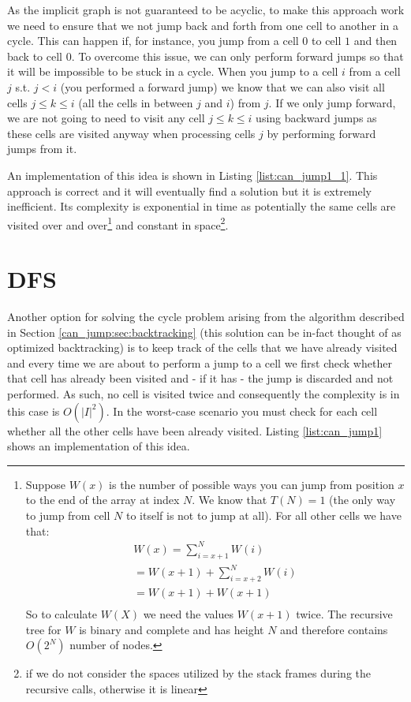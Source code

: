 As the implicit graph is not guaranteed to be acyclic, to make this
approach work we need to ensure that we not jump back and forth from one cell to another in a
cycle. 
This can happen if, for instance,  you jump from a cell $0$ to cell $1$ and then back to cell
$0$. To overcome this issue, we can only perform forward jumps so that it will be impossible
to be stuck in a cycle.
When you jump to a cell $i$ from a cell $j$ s.t. $j < i$ (you performed a forward jump) we know that we can also visit all cells $ j \leq
k \leq i$ (all the cells in between $j$ and $i$) from $j$.
If we only jump forward, we are not going to need to visit any cell $ j \leq k \leq i$ using backward jumps as these cells are visited anyway when processing
cells $j$ by performing forward jumps from it.

An implementation of this idea is shown in Listing
\ref{list:can_jump1_1}. 
This approach is correct and it will eventually find a solution but it is
extremely inefficient. Its complexity is exponential in time as potentially the same cells are
visited over and over\footnote{Suppose $W(x)$ is the number of possible ways you can jump from
position $x$ to the end of the array at index $N$. We know that $T(N) = 1$ (the only way to jump
from cell $N$ to itself is not to jump at all). For all other cells we have that:
    \begin{align*}
        W(x) = \sum_{i=x+1}^N W(i) \\
         = W(x+1) + \sum_{i=x+2}^N W(i) \\
         = W(x+1) + W(x+1) \\
      \end{align*}
    So to calculate $W(X)$ we need the values  $W(x+1)$ twice. The recursive tree for
    $W$ is binary and complete and has height $N$ and therefore contains $O(2^N)$ number of nodes.}
    and constant in space\footnote{if we do not consider the spaces utilized by the stack frames
    during the recursive calls, otherwise it is linear}.

    
 
\section{DFS}
\label{can_jump:sec:DFS}
Another option for solving the cycle problem arising from the algorithm described in Section
\ref{can_jump:sec:backtracking} (this solution can be in-fact thought of as optimized backtracking)
is to keep track of the cells that we have already visited and every time we are about to perform a
jump to a cell we first check whether that cell has already been visited and  - if it has - 
the jump is discarded and not performed. As such, no cell is visited twice and consequently the complexity is in this case is $O(|I|^2)$. In the worst-case scenario you must check for each
cell whether all the other cells have been already visited. Listing \ref{list:can_jump1} shows an
implementation of this idea. 


